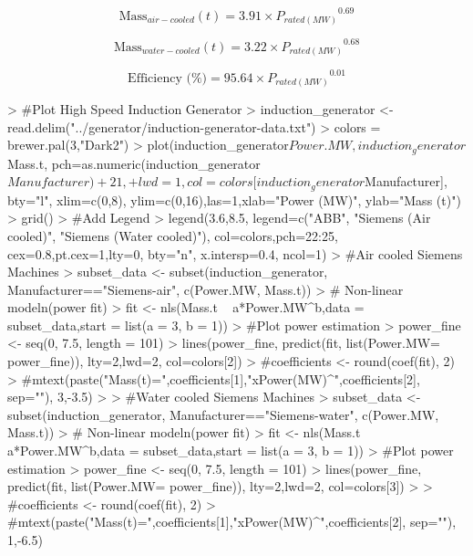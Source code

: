 \documentclass{article}
\begin{document}
\begin{equation}
  \text{Mass}_{air-cooled}(t) = 3.91 \times {P_{rated(MW)}}^{0.69}
  \label{mass-air}
\end{equation}

\begin{equation}
  \text{Mass}_{water-cooled}(t) = 3.22 \times {P_{rated(MW)}}^{0.68}
  \label{mass-water}
\end{equation}

\begin{equation}
\text{Efficiency (\%)} = 95.64 \times {P_{rated(MW)}}^{0.01}
\end{equation}


\begin{Schunk}
\begin{Sinput}
> #Plot High Speed Induction Generator
> induction_generator <- read.delim("../generator/induction-generator-data.txt")
> colors = brewer.pal(3,"Dark2")
> plot(induction_generator$Power.MW, induction_generator$Mass.t, pch=as.numeric(induction_generator$Manufacturer)+21, 
+      lwd=1, col=colors[induction_generator$Manufacturer], bty="l", xlim=c(0,8), ylim=c(0,16),las=1,xlab="Power (MW)", ylab="Mass (t)")
> grid()
> #Add Legend
> legend(3.6,8.5, legend=c("ABB", "Siemens (Air cooled)", "Siemens (Water cooled)"), col=colors,pch=22:25, cex=0.8,pt.cex=1,lty=0, bty="n", x.intersp=0.4, ncol=1)
> #Air cooled Siemens Machines
> subset_data <- subset(induction_generator, Manufacturer=="Siemens-air", c(Power.MW, Mass.t))
> # Non-linear modeln(power fit)
> fit <- nls(Mass.t ~ a*Power.MW^b,data = subset_data,start = list(a = 3, b = 1))
> #Plot power estimation
> power_fine <- seq(0, 7.5, length = 101)
> lines(power_fine, predict(fit, list(Power.MW= power_fine)), lty=2,lwd=2, col=colors[2])
> #coefficients <- round(coef(fit), 2) 
> #mtext(paste("Mass(t)=",coefficients[1],"xPower(MW)^",coefficients[2], sep=""), 3,-3.5)
> 
> #Water cooled Siemens Machines
> subset_data <- subset(induction_generator, Manufacturer=="Siemens-water", c(Power.MW, Mass.t))
> # Non-linear modeln(power fit)
> fit <- nls(Mass.t ~ a*Power.MW^b,data = subset_data,start = list(a = 3, b = 1))
> #Plot power estimation
> power_fine <- seq(0, 7.5, length = 101)
> lines(power_fine, predict(fit, list(Power.MW= power_fine)), lty=2,lwd=2, col=colors[3])
> 
> #coefficients <- round(coef(fit), 2) 
> #mtext(paste("Mass(t)=",coefficients[1],"xPower(MW)^",coefficients[2], sep=""), 1,-6.5)
\end{Sinput}
\end{Schunk}
\end{document}
